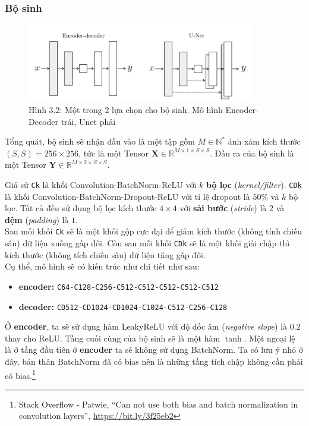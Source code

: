 \documentclass[a4paper]{article}
\begin{document}
\subsubsection{Bộ sinh}
\begin{figure}[h!]
\centering
\includegraphics[width=10cm]{images/3_2.PNG}
\caption{Hình 3.2: Một trong 2 lựa chọn cho bộ sinh. Mô hình Encoder-Decoder trái, Unet phải}
\end{figure}

\noindent
Tổng quát, bộ sinh sẽ nhận đầu vào là một tập gồm $M \in \mathbb{N}^*$ ảnh xám kích thước $(S, S) = 256\times 256$, tức là một Tensor $\mathbf{X} \in \mathbb{R}^{M\times 1 \times S \times S}$. Đầu ra của bộ sinh là một Tensor $\mathbf{Y} \in \mathbb{R}^{M\times 2 \times S \times S}$.

\noindent
Giả sử \texttt{Ck} là khối Convolution-BatchNorm-ReLU với $k$ \textbf{bộ lọc} (\textit{kernel/filter}). \texttt{CDk} là khối Convolution-BatchNorm-Dropout-ReLU với tỉ lệ dropout là $50\%$ và $k$ bộ lọc. Tất cả đều sử dụng bộ lọc kích thước $4\times 4$ với \textbf{sải bước} (\textit{stride}) là $2$ và \textbf{đệm} (\textit{padding}) là $1$.\\
Sau mỗi khối \texttt{Ck} sẽ là một khối gộp cực đại để giảm kích thước (không tính chiều sâu) dữ liệu xuống gấp đôi. Còn sau mỗi khối \texttt{CDk} sẽ là một khối giải chập thì kích thước (không tích chiều sâu) dữ liệu tăng gấp đôi.\\
Cụ thể, mô hình sẽ có kiến trúc như chi tiết như sau:

\begin{itemize}
    \item \textbf{encoder:} \texttt{C64-C128-C256-C512-C512-C512-C512-C512}
    
    \item \textbf{decoder:} \texttt{CD512-CD1024-CD1024-C1024-C512-C256-C128}
\end{itemize}

\noindent
Ở \textbf{encoder}, ta sẽ sử dụng hàm LeakyReLU với độ dốc âm (\textit{negative slope}) là $0.2$ thay cho ReLU. Tầng cuối cùng của bộ sinh sẽ là một hàm $\tanh$. Một ngoại lệ là ở tầng đầu tiên ở \textbf{encoder} ta sẽ không sử dụng BatchNorm. Ta có lưu ý nhỏ ở đây, bản thân BatchNorm đã có bias nên là những tầng tích chập không cần phải có bias.\footnote{Stack Overflow - Patwie, ``Can not use both bias and batch normalization in convolution layers'', \href{https://bit.ly/3f25eb2}{https://bit.ly/3f25eb2}}
\end{document}
